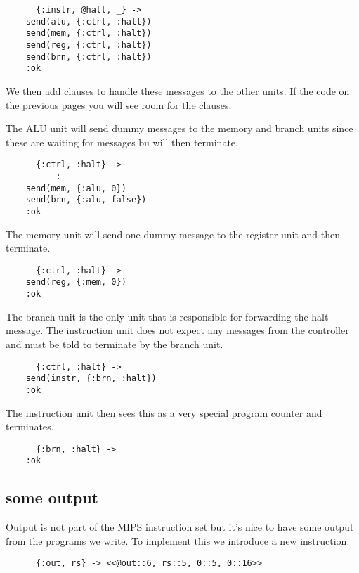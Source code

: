 \documentclass[a4paper,11pt]{article}
\begin{document}
\begin{verbatim}
      {:instr, @halt, _} ->
	send(alu, {:ctrl, :halt})
	send(mem, {:ctrl, :halt})
	send(reg, {:ctrl, :halt})
	send(brn, {:ctrl, :halt})
	:ok
\end{verbatim}

We then add clauses to handle these  messages to the other units. If the code on the
previous pages you will see room for the clauses.

The ALU unit will send dummy messages to the memory and branch units
since these are waiting for messages bu will then terminate.

\begin{verbatim}
      {:ctrl, :halt} ->
          :
	send(mem, {:alu, 0})		
	send(brn, {:alu, false})
	:ok
\end{verbatim}

The memory unit will send one dummy message to the register unit and then terminate.

\begin{verbatim}
      {:ctrl, :halt} ->
	send(reg, {:mem, 0})		
	:ok
\end{verbatim}

The branch unit is the only unit that is responsible for forwarding
the halt message. The instruction unit does not expect any messages
from the controller and must be told to terminate by the branch unit.

\begin{verbatim}
      {:ctrl, :halt} ->
	send(instr, {:brn, :halt})
	:ok
\end{verbatim}

The instruction unit then sees this as a very special program counter
and terminates.

\begin{verbatim}
      {:brn, :halt} ->
	:ok
\end{verbatim}

      
\subsection{some output}

Output is not part of the MIPS instruction set but it's nice to have
some output from the programs we write. To implement this we introduce
a new instruction.

\begin{verbatim}
      {:out, rs} -> <<@out::6, rs::5, 0::5, 0::16>>
\end{verbatim}
    
\end{document}
